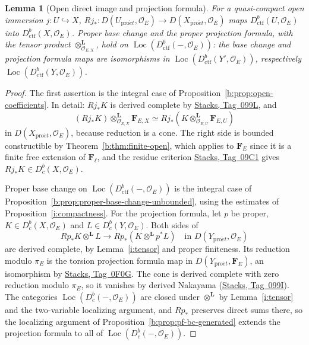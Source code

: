 \documentclass[11pt,a4paper]{article}
\numberwithin{equation}{section}
\newtheorem{lemma}[theorem]{Lemma}
\theoremstyle{definition}
\theoremstyle{remark}
\newcommand{\Dbc}{D^b_c}
\newcommand{\Loc}{\operatorname{Loc}}
\newcommand{\Fell}{\mathbf F_\ell}
\newcommand{\proet}{\mathrm{pro}\acute{e}t}
\newcommand{\stacks}[1]{\href{https://stacks.math.columbia.edu/tag/#1}{\textnormal{Stacks, Tag~#1}}}
\newcommand{\Dctf}{D^b_{\mathrm{ctf}}}
\begin{document}
\begin{lemma}[Open direct image and projection formula]
\label{i:open-pf}
For a quasi-compact open immersion $j:U\hookrightarrow X$,
$Rj_*\colon D(U_{\proet},\mathcal O_E)\to D(X_{\proet},\mathcal O_E)$ maps
$\Dctf(U,\mathcal O_E)$ into $\Dctf(X,\mathcal O_E)$.
Proper base change and the proper projection formula, with the tensor
product $\otimes^{\mathbf L}_{\mathcal O_{E,X}}$, hold on
$\Loc(\Dctf(-,\mathcal O_E))$: the base change and projection formula maps
are isomorphisms in $\Loc(\Dctf(Y',\mathcal O_E))$, respectively
$\Loc(\Dctf(Y,\mathcal O_E))$.
\end{lemma}
\begin{proof}
The first assertion is the integral case of
Proposition~\ref{b:prop:open-coefficients}. In detail: $Rj_*K$ is derived
complete by \stacks{099L}, and
\[
 (Rj_*K)\otimes^{\mathbf L}_{\mathcal O_{E,X}}\mathbf F_{E,X}
       \simeq Rj_*(K\otimes^{\mathbf L}_{\mathcal O_{E,U}}\mathbf F_{E,U})
\]
in $D(X_{\proet},\mathcal O_E)$, because reduction is a cone. The right side is bounded constructible by
Theorem~\ref{b:thm:finite-open}, which applies to $\mathbf F_E$ since it
is a finite free extension of $\Fell$, and the residue criterion
\stacks{09C1} gives $Rj_*K\in\Dbc(X,\mathcal O_E)$.

Proper base change on $\Loc(\Dctf(-,\mathcal O_E))$ is the integral case
of Proposition~\ref{b:prop:proper-base-change-unbounded}, using the
estimates of Proposition~\ref{i:compactness}. For the projection
formula, let $p$ be proper,
$K\in \Dbc(X,\mathcal O_E)$ and $L\in \Dbc(Y,\mathcal O_E)$. Both sides of
\[
 Rp_*K\otimes^{\mathbf L}L\longrightarrow Rp_*(K\otimes^{\mathbf L}p^*L)
 \quad\text{in }D(Y_{\proet},\mathcal O_E)
\]
are derived complete, by Lemma~\ref{i:tensor} and proper finiteness. Its
reduction modulo $\pi_E$ is the torsion projection formula map in
$D(Y_{\proet},\mathbf F_E)$, an
isomorphism by \stacks{0F0G}. The cone is derived complete with zero
reduction modulo $\pi_E$, so it vanishes by derived Nakayama
(\stacks{099I}). The categories $\Loc(\Dbc(-,\mathcal O_E))$ are closed under
$\otimes^{\mathbf L}$ by Lemma~\ref{i:tensor} and the two-variable
localizing argument, and $Rp_*$ preserves direct sums there, so the
localizing argument of Proposition~\ref{b:prop:pf-bc-generated} extends the
projection formula to all of $\Loc(\Dbc(-,\mathcal O_E))$.
\end{proof}
\end{document}

